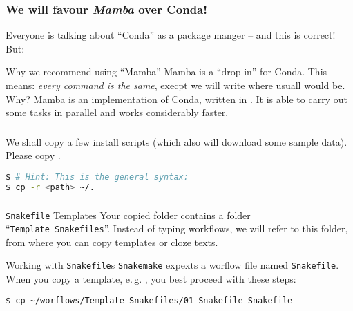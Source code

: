 \begin{frame}[fragile]
  \frametitle{We will favour \emph{Mamba} over Conda!}
  Everyone is talking about ``Conda'' as a package manger -- and this is correct! But:
  \begin{block}{Why we recommend using ``Mamba''}
   Mamba is a ``drop-in'' for Conda. This means: \emph{every command is the same}, execpt we will write  where usuall  would be.\newline
   Why?\newline
   Mamba is an implementation of Conda, written in \CC{}. It is able to carry out some tasks in parallel and works considerably faster.
  \end{block}
\end{frame}

\begin{frame}[fragile]
  \frametitle{}
  We shall copy a few install scripts (which also will download some sample data).\newline
  Please copy \pathtoexercise.\newline
  \begin{lstlisting}[language=Bash, style=Shell]
$ # Hint: This is the general syntax:
$ cp -r <path> ~/.
  \end{lstlisting}
\end{frame}

\begin{frame}[fragile]
  \frametitle{}
  \begin{block}{\texttt{Snakefile} Templates}
   Your copied folder contains a folder ``\texttt{Template\_Snakefiles}''. Instead of typing workflows, we will refer to this folder, from where you can copy templates or cloze texts.
  \end{block}
  \begin{exampleblock}{Working with \texttt{Snakefile}s}
   \texttt{Snakemake} expexts a worflow file named \texttt{Snakefile}. When you copy a template, e.\,g. , you best proceed with these steps:
   \begin{lstlisting}[language=Bash, style=Shell,basicstyle=\footnotesize]
$ cp ~/worflows/Template_Snakefiles/01_Snakefile Snakefile
   \end{lstlisting}
  \end{exampleblock}
\end{frame}


